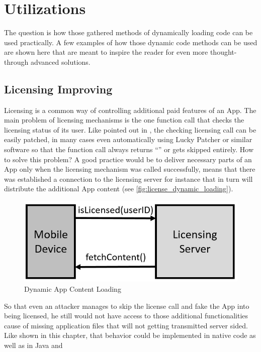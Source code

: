 \section{Utilizations}
The question is how those gathered methods of dynamically loading code can be
used practically. A few examples of how those dynamic code methods can be used
are shown here that are meant to inspire the reader for even more thought-through
advanced solutions.

\subsection{Licensing Improving}
Licensing is a common way of controlling additional paid
features of an App. The main problem of licensing mechanisms is the one
function call that checks the licensing status of its user. Like pointed
out in \parencite{app_sec}, the checking licensing call can be easily
patched, in many cases even automatically using Lucky Patcher or similar
software so that the function call always returns ``''
or gets skipped entirely. How to solve this problem? A good practice would be to deliver necessary parts of an App only when the licensing mechanism was
called successfully, means that there was established a connection to the
licensing server for instance that in turn will distribute the additional
App content (see \autoref{fig:license_dynamic_loading}).
\begin{figure}[htb]
  \centering
  \includegraphics[scale=0.5]{figures/license_dynamic_loading}
  \caption[Dynamic App Content Loading]{Dynamic App Content Loading}
  \label{fig:license_dynamic_loading}
\end{figure}
So that even an attacker manages to skip the license call and fake the App
into being licensed, he still would not have access to those additional
functionalities cause of missing application files that will not getting
transmitted server sided. Like shown in this chapter,
that behavior could be implemented in native code as well as in Java and
